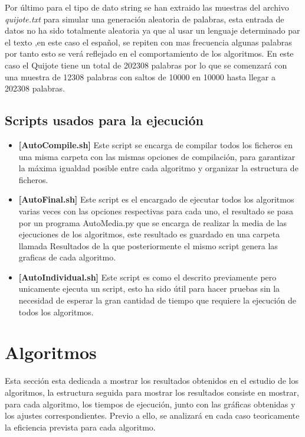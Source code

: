 \documentclass[11pt]{article}
\begin{document}
    Por último para el tipo de dato string se han extraido las muestras del archivo \textit{quijote.txt} para simular una generación aleatoria de palabras, esta entrada de datos no ha sido totalmente aleatoria ya que al usar un lenguaje determinado par el texto  ,en este caso el español, se repiten con mas frecuencia algunas palabras por tanto esto se verá 
    reflejado en el comportamiento de los  algoritmos. En este caso el Quijote tiene un total de 202308 palabras por lo que se comenzará con una muestra de 12308 palabras con saltos de 
    10000 en 10000 hasta llegar a 202308 palabras.
    \subsection{Scripts usados para la ejecución}
    \begin{itemize}
        \item \textbf{[AutoCompile.sh]} Este script se encarga de compilar todos los ficheros en una misma carpeta con las mismas
        opciones de compilación, para garantizar la máxima igualdad posible entre cada algoritmo y organizar la estructura de 
        ficheros.
        \item \textbf{[AutoFinal.sh]} Este script es el encargado de ejecutar todos los algoritmos varias veces con las opciones respectivas para cada uno,
        el resultado se pasa por un programa AutoMedia.py que se encarga de realizar la media de las ejecuciones de los algoritmos,
        este resultado es guardado en una carpeta llamada Resultados de la que posteriormente el mismo script genera las graficas
        de cada algoritmo.
        \item \textbf{[AutoIndividual.sh]} Este script es como el descrito previamente pero unicamente ejecuta un script, esto ha sido útil para hacer
        pruebas sin la necesidad de esperar la gran cantidad de tiempo que requiere la ejecución de todos los algoritmos.
    \end{itemize}
    
\section{Algoritmos}
Esta sección esta dedicada a mostrar los resultados obtenidos en el estudio de los algoritmos,
la estructura seguida para mostrar los resultados consiste en mostrar, para cada algoritmo, los tiempos 
de ejecución, junto con las gráficas obtenidas y los ajustes correspondientes. Previo a ello, se analizará
en cada caso teoricamente la eficiencia prevista para cada algoritmo.
\end{document}
